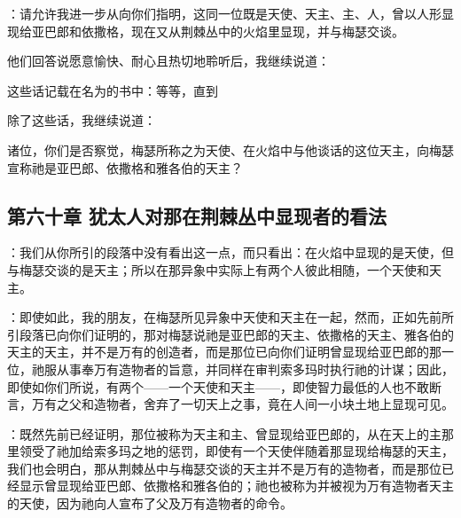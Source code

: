 ：请允许我进一步从向你们指明，这同一位既是天使、天主、主、人，曾以人形显现给亚巴郎和依撒格，现在又从荆棘丛中的火焰里显现，并与梅瑟交谈。\par

他们回答说愿意愉快、耐心且热切地聆听后，我继续说道：\par

这些话记载在名为的书中：等等，直到\par

除了这些话，我继续说道：\par

诸位，你们是否察觉，梅瑟所称之为天使、在火焰中与他谈话的这位天主，向梅瑟宣称祂是亚巴郎、依撒格和雅各伯的天主？\par


\subsection{第六十章 犹太人对那在荆棘丛中显现者的看法}

：我们从你所引的段落中没有看出这一点，而只看出：在火焰中显现的是天使，但与梅瑟交谈的是天主；所以在那异象中实际上有两个人彼此相随，一个天使和天主。\par

：即使如此，我的朋友，在梅瑟所见异象中天使和天主在一起，然而，正如先前所引段落已向你们证明的，那对梅瑟说祂是亚巴郎的天主、依撒格的天主、雅各伯的天主的天主，并不是万有的创造者，而是那位已向你们证明曾显现给亚巴郎的那一位，祂服从事奉万有造物者的旨意，并同样在审判索多玛时执行祂的计谋；因此，即使如你们所说，有两个——一个天使和天主——，即使智力最低的人也不敢断言，万有之父和造物者，舍弃了一切天上之事，竟在人间一小块土地上显现可见。\par

：既然先前已经证明，那位被称为天主和主、曾显现给亚巴郎的，从在天上的主那里领受了祂加给索多玛之地的惩罚，即使有一个天使伴随着那显现给梅瑟的天主，我们也会明白，那从荆棘丛中与梅瑟交谈的天主并不是万有的造物者，而是那位已经显示曾显现给亚巴郎、依撒格和雅各伯的；祂也被称为并被视为万有造物者天主的天使，因为祂向人宣布了父及万有造物者的命令。\par

